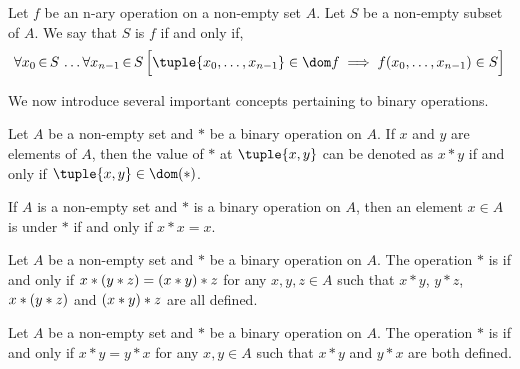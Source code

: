 \begin{dfn}
    \label{dfn:closed-operation}
    Let \( f \) be an n-ary operation on a non-empty set \( A \). Let \( S \) be a non-empty subset of \( A \).
    We say that \( S \) is  \( f \) if and only if,
    \begin{equation*}
        \forall x_{0}\,{\in}\,S \, \dots \forall x_{n-1}\,{\in}\,S \, \Big[ \tuple{x_{0}, \dots, x_{n-1}} \in \dom f \implies f(x_{0},\dots,x_{n-1}) \in S \Big]
    \end{equation*}
\end{dfn}

\noindent
We now introduce several important concepts pertaining to binary operations.

\begin{notation}[Infix]
    \label{notation:infix-notation-for-binary-operations}
    Let \( A \) be a non-empty set and \( \ast \) be a binary operation on \( A \). If \( x \) and \( y \) are elements of \( A \),
    then the value of \( \ast \) at \( \tuple{x,y} \) can be denoted as \( x \ast y \) if and only if \( \tuple{x,y} \in \dom (\ast) \).
    
\end{notation}

\begin{dfn}[Idempotence]
    \label{dfn:idempotence-of-element-under-binary-operations}
    If \( A \) is a non-empty set and \( \ast \) is a binary operation on \( A \), then an element \( x \in A \) is  under
    \( \ast \) if and only if \( x \ast x = x \).
\end{dfn}

\begin{dfn}[Associativity]
    \label{dfn:associativity-of-binary-operations}
    Let \( A \) be a non-empty set and \( \ast \) be a binary operation on \( A \). The operation \( \ast \)
    is  if and only if \( x \ast \mleft( y \ast z \mright) = \mleft( x \ast y \mright) \ast z \)
    for any \( x, y, z \in A \) such that \( x \ast y \), \( y \ast z \),
    \( x \ast \mleft( y \ast z \mright) \) and \( \mleft( x \ast y \mright) \ast z \) are all defined.
\end{dfn}

\begin{dfn}[Commutativity]
    \label{dfn:commutativity-of-binary-operations}
    Let \( A \) be a non-empty set and \( \ast \) be a binary operation on \( A \). The operation \( \ast \)
    is  if and only if \( x \ast y = y \ast x \) for any \( x,y \in A \) such that \( x \ast y \)
    and \( y \ast x \) are both defined.
\end{dfn}

